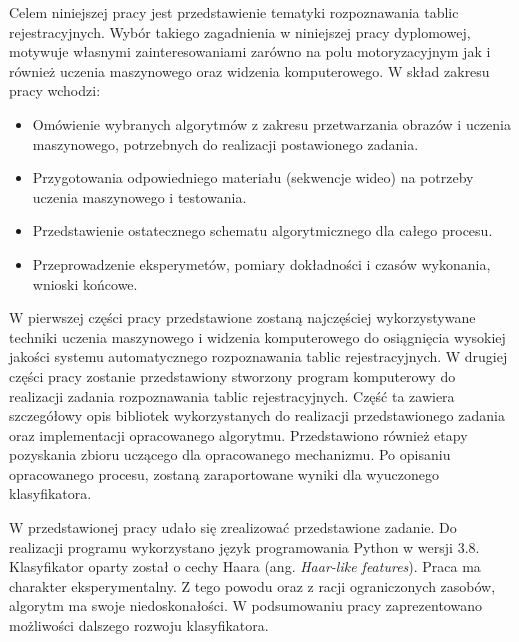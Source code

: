 Celem niniejszej pracy jest przedstawienie tematyki rozpoznawania tablic rejestracyjnych.
Wybór takiego zagadnienia w niniejszej pracy dyplomowej, motywuje własnymi zainteresowaniami zarówno na polu motoryzacyjnym jak i również uczenia maszynowego oraz widzenia komputerowego.
W skład zakresu pracy wchodzi:
\begin{itemize}
    \item Omówienie wybranych algorytmów z zakresu przetwarzania obrazów i uczenia maszynowego, potrzebnych
    do realizacji postawionego zadania.
    \item Przygotowania odpowiedniego materiału (sekwencje wideo) na potrzeby uczenia maszynowego i testowania.
    \item Przedstawienie ostatecznego schematu algorytmicznego dla całego procesu.
    \item Przeprowadzenie eksperymetów, pomiary dokładności i czasów wykonania, wnioski końcowe.
\end{itemize}

W pierwszej części pracy przedstawione zostaną najczęściej wykorzystywane techniki uczenia maszynowego i widzenia komputerowego do osiągnięcia wysokiej jakości systemu automatycznego rozpoznawania tablic rejestracyjnych.
W drugiej części pracy zostanie przedstawiony stworzony program komputerowy do realizacji zadania rozpoznawania tablic rejestracyjnych.
Część ta zawiera szczegółowy opis bibliotek wykorzystanych do realizacji przedstawionego zadania oraz implementacji opracowanego algorytmu.
Przedstawiono również etapy pozyskania zbioru uczącego dla opracowanego mechanizmu.
Po opisaniu opracowanego procesu, zostaną zaraportowane wyniki dla wyuczonego klasyfikatora.

W przedstawionej pracy udało się zrealizować przedstawione zadanie.
Do realizacji programu wykorzystano język programowania Python w wersji 3.8.
Klasyfikator oparty został o cechy Haara (ang. \textit{Haar-like features}).
Praca ma charakter eksperymentalny.
Z tego powodu oraz z racji ograniczonych zasobów, algorytm ma swoje niedoskonałości.
W podsumowaniu pracy zaprezentowano możliwości dalszego rozwoju klasyfikatora.
